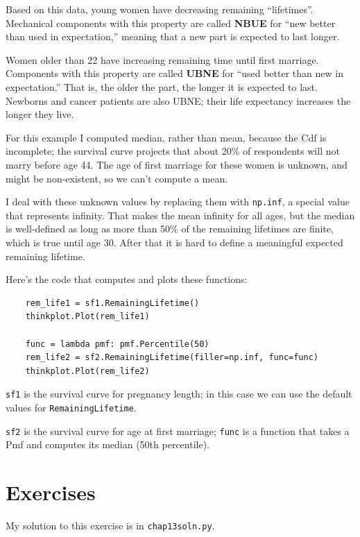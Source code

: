 \documentclass[12pt]{book}
\begin{document}
Based on this data, young women have decreasing remaining
``lifetimes''.  Mechanical components with this property are called {\bf NBUE}
for ``new better than used in expectation,'' meaning that a new part is
expected to last longer.

Women older than 22 have increasing remaining time until first
marriage.  Components with this property are called {\bf UBNE} for
``used better than new in expectation.''  That is, the older the part,
the longer it is expected to last.  Newborns and cancer patients are
also UBNE; their life expectancy increases the longer they live.

For this example I computed median, rather than mean, because the
Cdf is incomplete; the survival curve projects that about 20\%
of respondents will not marry before age 44.  The age of
first marriage for these women is unknown, and might be non-existent,
so we can't compute a mean.

I deal with these unknown values by replacing them with \verb"np.inf",
a special value that represents infinity.  That makes the mean
infinity for all ages, but the median is well-defined as long as
more than 50\% of the remaining lifetimes are finite, which is true
until age 30.  After that it is hard to define a meaningful
expected remaining lifetime.

Here's the code that computes and plots these functions:

\begin{verbatim}
    rem_life1 = sf1.RemainingLifetime()
    thinkplot.Plot(rem_life1)

    func = lambda pmf: pmf.Percentile(50)
    rem_life2 = sf2.RemainingLifetime(filler=np.inf, func=func)
    thinkplot.Plot(rem_life2)
\end{verbatim}

\verb"sf1" is the survival curve for pregnancy length;
in this case we can use the default values for \verb"RemainingLifetime".

\verb"sf2" is the survival curve for age at first marriage;
\verb"func" is a function that takes a Pmf and computes its
median (50th percentile).


\section{Exercises}

My solution to this exercise is in \verb"chap13soln.py".
\end{document}
